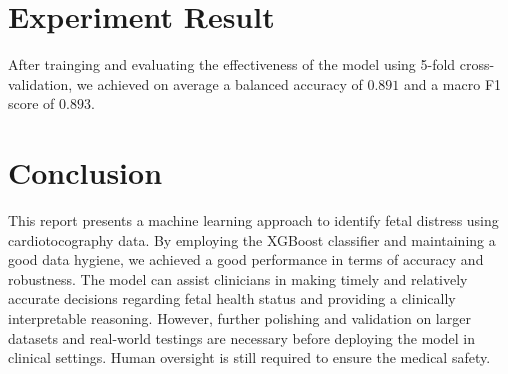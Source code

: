 \documentclass{article}
\begin{document}
\section{Experiment Result}

After trainging and evaluating the effectiveness of the model using 5-fold cross-validation, we achieved on average a balanced accuracy of $0.891$ and a macro F1 score of $0.893$. 

\section{Conclusion}

This report presents a machine learning approach to identify fetal distress using cardiotocography data. By employing the XGBoost classifier and maintaining a good data hygiene, we achieved a good performance in terms of accuracy and robustness. The model can assist clinicians in making timely and relatively accurate decisions regarding fetal health status and providing a clinically interpretable reasoning. However, further polishing and validation on larger datasets and real-world testings are necessary before deploying the model in clinical settings. Human oversight is still required to ensure the medical safety.



\end{document}
